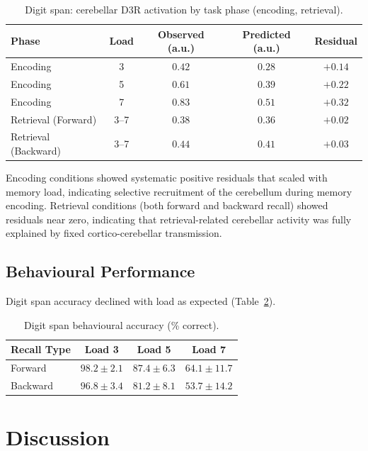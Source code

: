 \documentclass[11pt]{article}
\begin{document}
\begin{table}[H]
\centering
\caption{Digit span: cerebellar D3R activation by task phase (encoding, retrieval).}
\label{tab:wm_activation}
\begin{tabular}{@{}lcccc@{}}
\toprule
Phase & Load & Observed (a.u.) & Predicted (a.u.) & Residual \\
\midrule
Encoding & 3 & $0.42$ & $0.28$ & $\mathbf{+0.14}$ \\
Encoding & 5 & $0.61$ & $0.39$ & $\mathbf{+0.22}$ \\
Encoding & 7 & $0.83$ & $0.51$ & $\mathbf{+0.32}$ \\
Retrieval (Forward) & 3--7 & $0.38$ & $0.36$ & $+0.02$ \\
Retrieval (Backward) & 3--7 & $0.44$ & $0.41$ & $+0.03$ \\
\bottomrule
\end{tabular}
\end{table}

Encoding conditions showed systematic positive residuals that scaled with memory load, indicating selective recruitment of the cerebellum during memory encoding. Retrieval conditions (both forward and backward recall) showed residuals near zero, indicating that retrieval-related cerebellar activity was fully explained by fixed cortico-cerebellar transmission.

\subsection{Behavioural Performance}

Digit span accuracy declined with load as expected (Table~\ref{tab:behaviour}).

\begin{table}[H]
\centering
\caption{Digit span behavioural accuracy (\% correct).}
\label{tab:behaviour}
\begin{tabular}{@{}lccc@{}}
\toprule
Recall Type & Load 3 & Load 5 & Load 7 \\
\midrule
Forward & $98.2 \pm 2.1$ & $87.4 \pm 6.3$ & $64.1 \pm 11.7$ \\
Backward & $96.8 \pm 3.4$ & $81.2 \pm 8.1$ & $53.7 \pm 14.2$ \\
\bottomrule
\end{tabular}
\end{table}

\section{Discussion}
\end{document}
